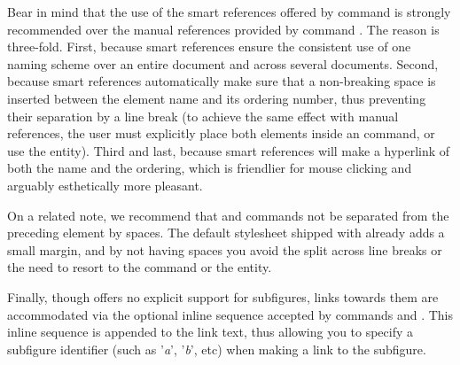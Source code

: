 Bear in mind that the use of the smart references offered by command \mono{\\sref}
is strongly recommended over the manual references provided by command \mono{\\dref}.
The reason is three-fold.  First, because smart references ensure the consistent use
of one naming scheme over an entire document and across several documents.  Second,
because smart references automatically make sure that a non-breaking space is inserted
between the element name and its ordering number, thus preventing their separation
by a line break (to achieve the same effect with manual references, the user must
explicitly place both elements inside an \mono{\\mbox} command, or use the 
 entity).  Third and last, because smart references will make a hyperlink
of both the name and the ordering, which is friendlier for mouse clicking and arguably
esthetically more pleasant.

On a related note, we recommend that \mono{\\see} and \mono{\\cite} commands not be
separated from the preceding element by spaces.  The default  stylesheet
shipped with \lambtex already adds a small margin, and by not having spaces you
avoid the split across line breaks or the need to resort to the \mono{\\mbox} command
or the   entity.

Finally, though \lambtex offers no explicit support for subfigures, links towards them
are accommodated via the optional inline sequence accepted by commands \mono{\\dref}
and \mono{\\sref}.  This inline sequence is appended to the link text, thus allowing
you to specify a subfigure identifier (such as '\emph{a}', '\emph{b}', etc) when making
a link to the subfigure.

